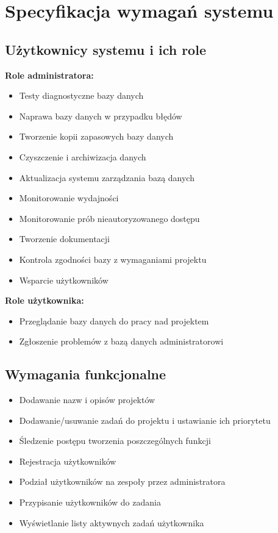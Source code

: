 \documentclass[a4paper,12pt]{article}
\begin{document}
\section{Specyfikacja wymagań systemu}

\subsection{Użytkownicy systemu i ich role}

\textbf{Role administratora:}
\begin{itemize}
  \item Testy diagnostyczne bazy danych
  \item Naprawa bazy danych w przypadku błędów
  \item Tworzenie kopii zapasowych bazy danych
  \item Czyszczenie i archiwizacja danych
  \item Aktualizacja systemu zarządzania bazą danych
  \item Monitorowanie wydajności
  \item Monitorowanie prób nieautoryzowanego dostępu
  \item Tworzenie dokumentacji
  \item Kontrola zgodności bazy z wymaganiami projektu
  \item Wsparcie użytkowników
\end{itemize}

\textbf{Role użytkownika:}
\begin{itemize}
  \item Przeglądanie bazy danych do pracy nad projektem
  \item Zgłoszenie problemów z bazą danych administratorowi
\end{itemize}

\subsection{Wymagania funkcjonalne}

\begin{itemize}
  \item Dodawanie nazw i opisów projektów
  \item Dodawanie/usuwanie zadań do projektu i ustawianie ich priorytetu
  \item Śledzenie postępu tworzenia poszczególnych funkcji
  \item Rejestracja użytkowników
  \item Podział użytkowników na zespoły przez administratora
  \item Przypisanie użytkowników do zadania
  \item Wyświetlanie listy aktywnych zadań użytkownika
\end{itemize}
\end{document}
